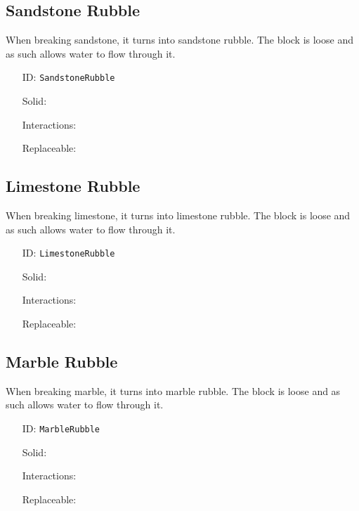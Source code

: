 \subsection{Sandstone Rubble}\label{subsec:blocks_sandstone rubble}
When breaking sandstone, it turns into sandstone rubble.
                The block is loose and as such allows water to flow through it.
\newline
\begin{itemize}[nosep]
\item[ID:] \texttt{SandstoneRubble}
\item[Solid:]  \Checkmark \item[Interactions:]  \XSolidBrush \item[Replaceable:]  \XSolidBrush \end{itemize}

\subsection{Limestone Rubble}\label{subsec:blocks_limestone rubble}
When breaking limestone, it turns into limestone rubble.
                The block is loose and as such allows water to flow through it.
\newline
\begin{itemize}[nosep]
\item[ID:] \texttt{LimestoneRubble}
\item[Solid:]  \Checkmark \item[Interactions:]  \XSolidBrush \item[Replaceable:]  \XSolidBrush \end{itemize}

\subsection{Marble Rubble}\label{subsec:blocks_marble rubble}
When breaking marble, it turns into marble rubble.
                The block is loose and as such allows water to flow through it.
\newline
\begin{itemize}[nosep]
\item[ID:] \texttt{MarbleRubble}
\item[Solid:]  \Checkmark \item[Interactions:]  \XSolidBrush \item[Replaceable:]  \XSolidBrush \end{itemize}

